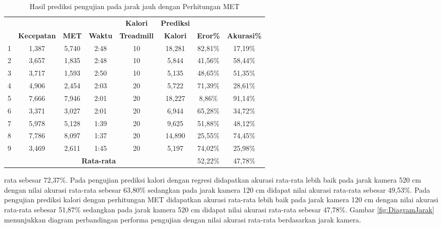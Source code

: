 \begin{longtable}{|c|c|c|c|c|c|c|c|}
  \caption{Hasil prediksi pengujian pada jarak jauh dengan Perhitungan MET}
  \label{tb:PengujianJarakJauhAnalisaPrediksiPerhitungan}                                   \\
  \hline
  \rowcolor[HTML]{C0C0C0}
  & & & & \textbf{Kalori} & \textbf{Prediksi} & & \\
  \rowcolor[HTML]{C0C0C0}
  \multirow{-2}{*}{\textbf{Percobaan}} & \multirow{-2}{*}{\textbf{Kecepatan}} & \multirow{-2}{*}{\textbf{MET}} & \multirow{-2}{*}{\textbf{Waktu}} & \textbf{Treadmill} & \textbf{Kalori} & \multirow{-2}{*}{\textbf{Eror\%}} & \multirow{-2}{*}{\textbf{Akurasi\%}} \\
  \hline
  1   & 1,387   & 5,740    & 2:48    & 10   & 18,281   & 82,81\%     & 17,19\%   \\
  \hline
  2   & 3,657   & 1,835    & 2:48    & 10   & 5,844    & 41,56\%     & 58,44\%   \\
  \hline
  3   & 3,717   & 1,593    & 2:50    & 10   & 5,135    & 48,65\%     & 51,35\%   \\
  \hline
  4   & 4,906   & 2,454    & 2:03    & 20   & 5,722    & 71,39\%     & 28,61\%   \\
  \hline
  5   & 7,666   & 7,946    & 2:01    & 20   & 18,227   & 8,86\%      & 91,14\%   \\
  \hline
  6   & 3,371   & 3,027    & 2:01    & 20   & 6,944    & 65,28\%     & 34,72\%   \\
  \hline
  7   & 5,978   & 5,128    & 1:39    & 20   & 9,625    & 51,88\%     & 48,12\%   \\
  \hline
  8   & 7,786   & 8,097    & 1:37    & 20   & 14,890   & 25,55\%     & 74,45\%   \\
  \hline
  9   & 3,469   & 2,611    & 1:45    & 20   & 5,197    & 74,02\%     & 25,98\%   \\
  \hline

  \multicolumn{6}{|c|}{\textbf{Rata-rata}} & 52,22\% & 47,78\%  \\
  \hline
\end{longtable}

\noindent
rata sebesar 72,37\%. Pada pengujian prediksi kalori dengan regresi didapatkan akurasi rata-rata lebih baik pada jarak kamera 520 cm dengan nilai akurasi rata-rata sebesar 63,80\% sedangkan pada jarak kamera 120 cm didapat nilai akurasi rata-rata sebesar 49,53\%. Pada pengujian prediksi kalori dengan perhitungan MET didapatkan akurasi rata-rata lebih baik pada jarak kamera 120 cm dengan nilai akurasi rata-rata sebesar 51,87\% sedangkan pada jarak kamera 520 cm didapat nilai akurasi rata-rata sebesar 47,78\%. Gambar \ref{fig:DiagramJarak} menunjukkan diagram perbandingan performa pengujian dengan nilai akurasi rata-rata berdasarkan jarak kamera.

